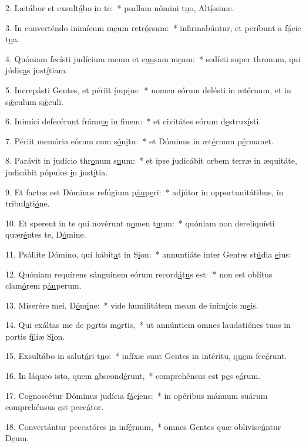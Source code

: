 2. Lætábor et exsult\uline{á}bo \uline{i}n te:~* psallam nómini t\uline{u}o, Alt\uline{í}ssime.\par 
3. In converténdo inimícum m\uline{e}um retr\uline{ó}rsum:~* infirmabúntur, et períbunt a f\uline{á}cie t\uline{u}a.\par 
4. Quóniam fecísti judícium meum et c\uline{au}sam m\uline{e}am:~* sedísti super thronum, qui júdic\uline{a}s just\uline{í}tiam.\par 
5. Increpásti Gentes, et périit \uline{í}mp\uline{i}us:~* nomen eórum delésti in ætérnum, et in s\uline{ǽ}culum s\uline{ǽ}culi.\par 
6. Inimíci defecérunt fráme\uline{æ} in f\uline{i}nem:~* et civitátes eórum d\uline{e}strux\uline{í}sti.\par 
7. Périit memória eórum cum s\uline{ó}n\uline{i}tu:~* et Dóminus in æt\uline{é}rnum p\uline{é}rmanet.\par 
8. Parávit in judício thr\uline{o}num s\uline{u}um:~* et ipse judicábit orbem terræ in æquitáte, judicábit pópulos \uline{i}n just\uline{í}tia.\par 
9. Et factus est Dóminus refúgium p\uline{áu}p\uline{e}ri:~* adjútor in opportunitátibus, in tribul\uline{a}ti\uline{ó}ne.\par 
10. Et sperent in te qui novérunt n\uline{o}men t\uline{u}um:~* quóniam non dereliquísti quær\uline{é}ntes te, D\uline{ó}mine.\par 
11. Psállite Dómino, qui hábit\uline{a}t in S\uline{i}on:~* annuntiáte inter Gentes st\uline{ú}dia \uline{e}jus:\par 
12. Quóniam requírens sánguinem eórum record\uline{á}t\uline{u}s est:~* non est oblítus clam\uline{ó}rem p\uline{áu}perum.\par 
13. Miserére mei, D\uline{ó}m\uline{i}ne:~* vide humilitátem meam de inim\uline{í}cis m\uline{e}is.\par 
14. Qui exáltas me de p\uline{o}rtis m\uline{o}rtis,~* ut annúntiem omnes laudatiónes tuas in portis f\uline{í}liæ S\uline{i}on.\par 
15. Exsultábo in salut\uline{á}ri t\uline{u}o:~* infíxæ sunt Gentes in intéritu, \uline{que}m fec\uline{é}runt.\par 
16. In láqueo isto, quem \uline{a}bscond\uline{é}runt,~* comprehénsus est p\uline{e}s e\uline{ó}rum.\par 
17. Cognoscétur Dóminus judícia f\uline{á}c\uline{i}ens:~* in opéribus mánuum suárum comprehénsus \uline{e}st pecc\uline{á}tor.\par 
18. Convertántur peccatóres \uline{i}n inf\uline{é}rnum,~* omnes Gentes quæ oblivisc\uline{ú}ntur D\uline{e}um.\par 
